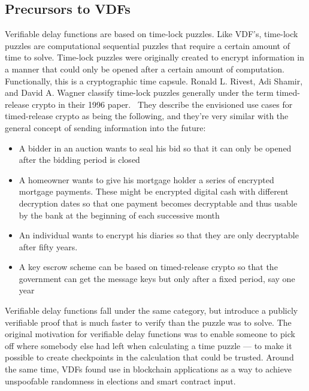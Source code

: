 
\subsection{Precursors to VDFs}
Verifiable delay functions are based on time-lock puzzles. Like VDF's, time-lock puzzles are computational sequential puzzles that require a certain amount of time to solve.\cite{Rivest_undated-qr} Time-lock puzzles were originally created to encrypt information in a manner that could only be opened after a certain amount of computation. Functionally, this is a cryptographic time capsule. Ronald L. Rivest, Adi Shamir, and David A. Wagner classify time-lock puzzles generally under the term timed-release crypto in their 1996 paper.~\cite{Rivest_undated-qr} They describe the envisioned use cases for timed-release crypto as being the following, and they're very similar with the general concept of sending information into the future:

\begin{itemize}
	\item A bidder in an auction wants to seal his bid so that it can only be opened after the bidding period is closed
	\item A homeowner wants to give his mortgage holder a series of encrypted mortgage payments. These might be encrypted digital cash with different decryption dates so that one payment becomes decryptable and thus usable by the bank at the beginning of each successive month
	\item An individual wants to encrypt his diaries so that they are only decryptable after fifty years.
	\item A key escrow scheme can be based on timed-release crypto so that the government can get the message keys but only after a fixed period, say one year
\end{itemize}

Verifiable delay functions fall under the same category, but introduce a publicly verifiable proof that is much faster to verify than the puzzle was to solve. The original motivation for verifiable delay functions was to enable someone to pick off where somebody else had left when calculating a time puzzle --- to make it possible to create checkpoints in the calculation that could be trusted. Around the same time, VDFs found use in blockchain applications as a way to achieve unspoofable randomness in elections and smart contract input.

